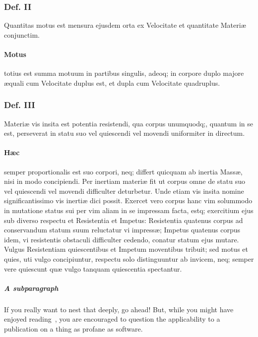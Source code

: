 \documentclass{ansarticle}
\begin{document}
\subsubsection{Def. II}
Quantitas motus est mensura ejusdem orta ex Velocitate et quantitate
Materi\ae{} conjunctim.

\paragraph{Motus}
totius est summa motuum in partibus singulis, adeoq; in corpore duplo
majore \ae{}quali cum Velocitate duplus est, et dupla cum Velocitate
quadruplus.

\subsubsection{Def. III}
Materi\ae{} vis insita est potentia resistendi, qua corpus unumquodq;,
quantum in se est, perseverat in statu suo vel quiescendi vel movendi
uniformiter in directum.

\paragraph{H\ae{}c}
semper proportionalis est suo corpori, neq; differt quicquam ab
inertia Mass\ae{}, nisi in modo concipiendi. Per inertiam materi\ae{} fit ut
corpus omne de statu suo vel quiescendi vel movendi difficulter
deturbetur. Unde etiam vis insita nomine significantissimo vis inerti\ae{}
dici possit. Exercet vero corpus hanc vim solummodo in mutatione
status sui per vim aliam in se impressam facta, estq; exercitium ejus
sub diverso respectu et Resistentia et Impetus: Resistentia quatenus
corpus ad conservandum statum suum reluctatur vi impress\ae{}; Impetus
quatenus corpus idem, vi resistentis obstaculi difficulter cedendo,
conatur statum ejus mutare. Vulgus Resistentiam quiescentibus et
Impetum moventibus tribuit; sed motus et quies, uti vulgo
concipiuntur, respectu solo distinguuntur ab invicem, neq; semper vere
quiescunt qu\ae{} vulgo tanquam quiescentia spectantur.

\subparagraph{A subparagraph} If you really want to nest that deeply, go
ahead! But, while you might have enjoyed
reading~\citet{Wittgenstein1921,Wittgenstein1981}, you are encouraged to
question the applicability to a publication on a thing as profane as
software.



\end{document}
